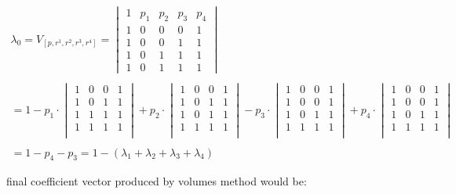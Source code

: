 		
		\begin{equation}
			\begin{align*}
						
					\lambda_0 =	V_{[p,r^1,r^2,r^3,r^4]} = 
					\begin{vmatrix}
						1 & p_{1} &  p_{2}& p_{3} & p_{4}\\
						1 & 0 & 0 & 0 & 1\\ 
						1 & 0 & 0 & 1 & 1\\ 
						1 &  0  & 1 & 1 & 1 \\ 
						1 & 0 & 1 & 1 & 1
						\end{vmatrix} \\  \\ 
						
						= 1 - p_1 \cdot \begin{vmatrix} 1 & 0 & 0 & 1 \\ 1 & 0 & 1 & 1 \\ 1 & 1 & 1 & 1 \\ 1 & 1 & 1 & 1 \\ \end{vmatrix} + 
						p_2 \cdot \begin{vmatrix} 1 & 0 & 0 & 1 \\ 1 & 0 & 1 & 1 \\ 1 & 0 & 1 & 1 \\ 1 & 1 & 1 & 1 \\ \end{vmatrix} - 
						p_3 \cdot \begin{vmatrix} 1 & 0 & 0 & 1 \\ 1 & 0 & 0 & 1 \\ 1 & 0 & 1 & 1 \\ 1 & 1 & 1 & 1 \\ \end{vmatrix} + 
						p_4 \cdot \begin{vmatrix} 1 & 0 & 0 & 1 \\ 1 & 0 & 0 & 1 \\ 1 & 0 & 1 & 1 \\ 1 & 1 & 1 & 1 \\ \end{vmatrix} \\ \\ 
						
						= 1 - p_4 - p_3 = 1 - (\lambda_1 + \lambda_2 + \lambda_3 + \lambda_4)
			\end{align*}
		\end{equation}
		
		
		final coefficient vector produced by volumes method would be:
		
